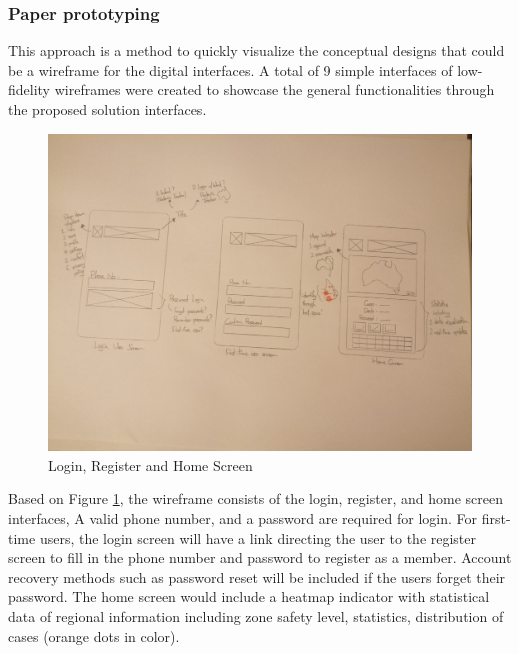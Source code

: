     \subsubsection{Paper prototyping}
      \par This approach is a method to quickly visualize the conceptual designs that could be a wireframe for
      the digital interfaces. A total of 9 simple interfaces of low-fidelity wireframes were created to
      showcase the general functionalities through the proposed solution interfaces.
      \begin{figure}[H]
        \centering
        \includegraphics[width=\linewidth]{img/low-fidelity-prototype/sketch-1.png}
        \caption{Login, Register and Home Screen}
        \label{fig:prototype-01}
      \end{figure}
      
      \par Based on Figure \ref{fig:prototype-01}, the wireframe consists of the login, register, and home screen interfaces, A valid phone number, and a password are required for login. For first-time users, the login screen will have a link directing the user to the register screen to fill in the phone number and password to register as a member. Account recovery methods such as password reset will be included if the users forget their password. The home screen would include a heatmap indicator with statistical data of regional information including zone safety level, statistics, distribution of cases (orange dots in color).
      
